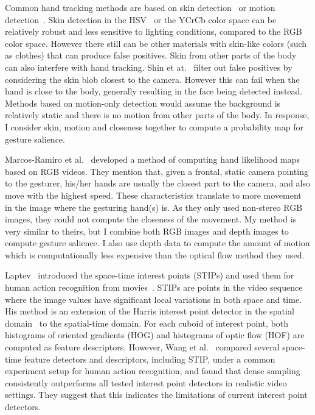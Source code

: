 Common hand tracking methods are based on skin detection~\cite{shin04} or
motion detection~\cite{cutler98}.
Skin detection in the HSV~\cite{bradski98} or the YCrCb color space can be
relatively robust and less sensitive to lighting conditions, compared to the RGB
color space. However there still can be other materials with skin-like colors (such as clothes) that can produce false positives. Skin from other parts of the body can also interfere with hand tracking. 
Shin et at.~\cite{shin04} filter out false positives by considering the skin blob closest to the camera. However this can fail when the hand is close to
the body, generally resulting in the face being detected instead. Methods based
on motion-only detection would assume the background is relatively static and
there is no motion from other parts of the body. In response, I consider
skin, motion and closeness together to compute a probability map for gesture salience.

Marcos-Ramiro et al.~\cite{marcos2013} developed a method of computing hand likelihood maps based on RGB videos. They mention that, given a frontal, static camera pointing to the gesturer,  his/her hands are usually the closest
part to the camera, and also move with the highest speed. These characteristics translate to more movement in the image where
the gesturing hand(s) is. As they only used non-stereo RGB images, they could
not compute the closeness of the movement.
My method is very similar to theirs, but I combine both RGB images and depth
 images to compute gesture salience. I also use depth data to compute the
 amount of motion which is computationally less expensive than the optical flow
 method they used.

Laptev~\cite{laptev03} introduced the space-time interest points (STIPs) and used them for human
action recognition from movies~\cite{laptev08}. STIPs are points in the video sequence where the image values have
significant local variations in both space and time. His method is an extension
of the Harris interest point detector in the spatial domain~\cite{Harris88} to
the spatial-time domain. For each cuboid of interest point, both histograms of oriented gradients (HOG) and histograms of optic flow (HOF) are computed as feature descriptors. However,
Wang et al.~\cite{wang-spatio-09} compared several space-time feature detectors
and descriptors, including STIP, under a common experiment setup for human
action recognition, and found that dense sampling consistently outperforms all
tested interest point detectors in realistic video settings. They suggest that
this indicates the limitations of current interest point detectors.

